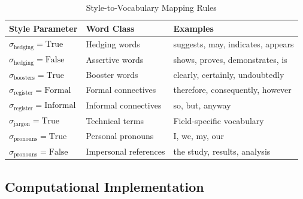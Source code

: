 \begin{table}[htbp]
\centering
\caption{Style-to-Vocabulary Mapping Rules}
\label{tab:vocabulary-rules}
\renewcommand{\arraystretch}{1.3}
\begin{tabular}{@{}lll@{}}
\toprule
\textbf{Style Parameter} & \textbf{Word Class} & \textbf{Examples} \\
\midrule
$\sigma_{\text{hedging}}=\text{True}$ & Hedging words & suggests, may, indicates, appears \\
$\sigma_{\text{hedging}}=\text{False}$ & Assertive words & shows, proves, demonstrates, is \\
$\sigma_{\text{boosters}}=\text{True}$ & Booster words & clearly, certainly, undoubtedly \\
$\sigma_{\text{register}}=\text{Formal}$ & Formal connectives & therefore, consequently, however \\
$\sigma_{\text{register}}=\text{Informal}$ & Informal connectives & so, but, anyway \\
$\sigma_{\text{jargon}}=\text{True}$ & Technical terms & Field-specific vocabulary \\
$\sigma_{\text{pronouns}}=\text{True}$ & Personal pronouns & I, we, my, our \\
$\sigma_{\text{pronouns}}=\text{False}$ & Impersonal references & the study, results, analysis \\
\bottomrule
\end{tabular}
\end{table}

\subsection{Computational Implementation}

